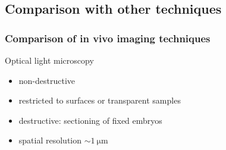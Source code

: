 \documentclass{beamer}
\def\imh{0.35\textheight}
\begin{document}
\subsection{Comparison with other techniques}

\begin{frame}
  \frametitle{Comparison of in vivo imaging techniques}
  Optical light microscopy
    \begin{itemize}
      \item non-destructive
      \item restricted to surfaces or transparent samples
      \item destructive: sectioning of fixed embryos
      \item spatial resolution $\sim\SI{1}{\micro\metre}$
    \end{itemize}
\end{frame}
\end{document}
